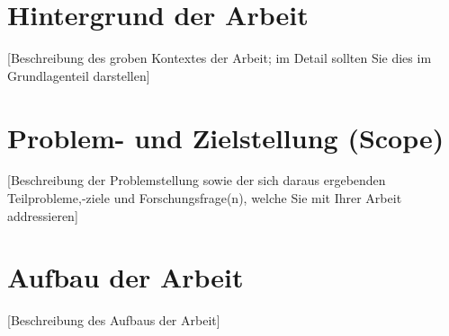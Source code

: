 \section{Hintergrund der Arbeit}
 [Beschreibung des groben Kontextes der Arbeit; im Detail sollten Sie dies im Grundlagenteil darstellen]


\section{Problem- und Zielstellung (Scope)}
 [Beschreibung der Problemstellung sowie der sich daraus ergebenden Teilprobleme,-ziele und Forschungsfrage(n), welche Sie mit Ihrer Arbeit addressieren]


\section{Aufbau der Arbeit}
 [Beschreibung des Aufbaus der Arbeit]
